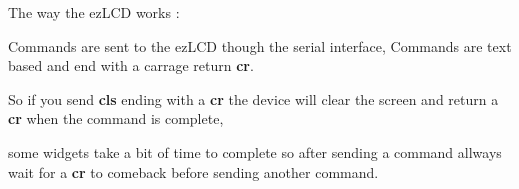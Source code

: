 The way the ez\-L\-C\-D works \-:\par
 Commands are sent to the ez\-L\-C\-D though the serial interface, Commands are text based and end with a carrage return {\bfseries cr}.\par
 So if you send {\bfseries cls} ending with a {\bfseries cr} the device will clear the screen and return a {\bfseries cr} when the command is complete,\par
 some widgets take a bit of time to complete so after sending a command allways wait for a {\bfseries cr} to comeback before sending another command.\par
 